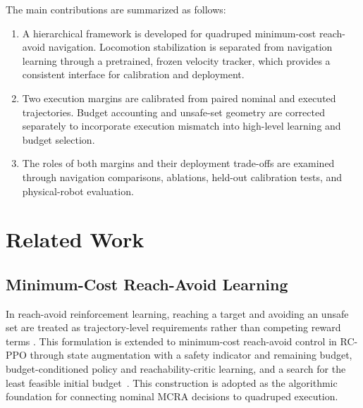 \documentclass[conference]{IEEEtran}
\begin{document}
The main contributions are summarized as follows:
\begin{enumerate}
\item A hierarchical framework is developed for quadruped minimum-cost reach-avoid
      navigation. Locomotion stabilization is separated from navigation learning
      through a pretrained, frozen velocity tracker, which provides a consistent
      interface for calibration and deployment.
\item Two execution margins are calibrated from paired nominal and executed
      trajectories. Budget accounting and unsafe-set geometry are corrected
      separately to incorporate execution mismatch into high-level learning and
      budget selection.
\item The roles of both margins and their deployment trade-offs are examined
      through navigation comparisons, ablations, held-out calibration tests, and
      physical-robot evaluation.
\end{enumerate}

\section{Related Work}
\subsection{Minimum-Cost Reach-Avoid Learning}
In reach-avoid reinforcement learning, reaching a target and avoiding an unsafe
set are treated as trajectory-level requirements rather than competing reward terms
\cite{bansal2017,hsu2021,ganai2023}. This formulation is extended to minimum-cost
reach-avoid control in RC-PPO through state augmentation with a safety indicator
and remaining budget, budget-conditioned policy and reachability-critic learning,
and a search for the least feasible initial budget~\cite{so2024}. This construction
is adopted as the algorithmic foundation for connecting nominal MCRA decisions
to quadruped execution.
\end{document}

